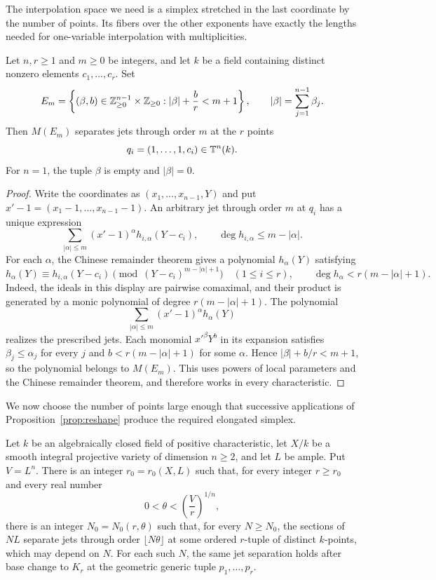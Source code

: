 The interpolation space we need is a simplex stretched in the last coordinate
by the number of points.  Its fibers over the other exponents have exactly the
lengths needed for one-variable interpolation with multiplicities.

\begin{lemma}\label{lem:elongated-jets}
Let $n,r\ge1$ and $m\ge0$ be integers, and let $k$ be a field containing
distinct nonzero elements $c_1,\ldots,c_r$.  Set
\begin{equation}\label{eq:interpolation-support}
 E_m=\left\{(\beta,b)\in\mathbb Z_{\ge0}^{n-1}\times\mathbb Z_{\ge0}:
          |\beta|+\frac br<m+1\right\},
 \qquad |\beta|=\sum_{j=1}^{n-1}\beta_j.
\end{equation}
Then $M(E_m)$ separates jets through order $m$ at the $r$ points
\[
 q_i=(1,\ldots,1,c_i)\in\mathbb T^n(k).
\]
For $n=1$, the tuple $\beta$ is empty and $|\beta|=0$.
\end{lemma}

\begin{proof}
Write the coordinates as $(x_1,\ldots,x_{n-1},Y)$ and put
$x'-1=(x_1-1,\ldots,x_{n-1}-1)$.  An arbitrary jet through order $m$ at $q_i$
has a unique expression
\[
 \sum_{|\alpha|\le m}(x'-1)^\alpha h_{i,\alpha}(Y-c_i),
 \qquad \deg h_{i,\alpha}\le m-|\alpha|.
\]
For each $\alpha$, the Chinese remainder theorem gives a polynomial
$h_\alpha(Y)$ satisfying
\[
 h_\alpha(Y)\equiv h_{i,\alpha}(Y-c_i)
   \pmod{(Y-c_i)^{m-|\alpha|+1}}
 \quad(1\le i\le r),
 \qquad
 \deg h_\alpha<r(m-|\alpha|+1).
\]
Indeed, the ideals in this display are pairwise comaximal, and their product
is generated by a monic polynomial of degree $r(m-|\alpha|+1)$.
The polynomial
\[
 \sum_{|\alpha|\le m}(x'-1)^\alpha h_\alpha(Y)
\]
realizes the prescribed jets.  Each monomial $x'^\beta Y^b$ in its expansion
satisfies $\beta_j\le\alpha_j$ for every $j$ and
$b<r(m-|\alpha|+1)$ for some $\alpha$.  Hence
$|\beta|+b/r<m+1$, so the polynomial belongs to $M(E_m)$.
This uses powers of local parameters and the Chinese remainder theorem,
and therefore works in every characteristic.
\end{proof}

We now choose the number of points large enough that successive applications
of Proposition~\ref{prop:reshape} produce the required elongated simplex.

\begin{proposition}\label{prop:generic-jets}
Let $k$ be an algebraically closed field of positive characteristic, let $X/k$
be a smooth integral projective variety of dimension $n\ge2$, and let $L$ be
ample.  Put $V=L^n$.  There is an integer $r_0=r_0(X,L)$ such that, for every
integer $r\ge r_0$ and every real number
\[
 0<\theta<\left(\frac Vr\right)^{1/n},
\]
there is an integer $N_0=N_0(r,\theta)$ such that, for every $N\ge N_0$,
the sections of $NL$ separate jets through order $\lfloor N\theta\rfloor$
at some ordered $r$-tuple of distinct $k$-points, which may depend on $N$.
For each such $N$, the same jet separation holds after base change to $K_r$
at the geometric generic tuple $p_1,\ldots,p_r$.
\end{proposition}

